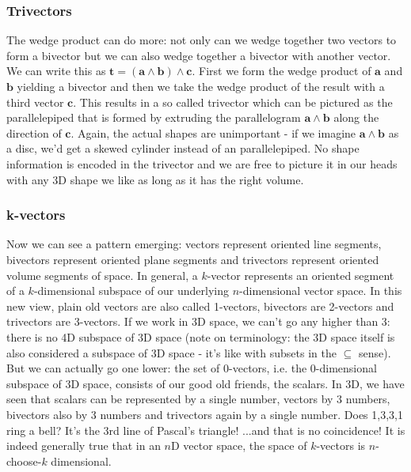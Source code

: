 \subsubsection{Trivectors}
The wedge product can do more: not only can we wedge together two vectors to form a bivector but we can also wedge together a bivector with another vector. We can write this as $\mathbf{t = (a \wedge b) \wedge c}$. First we form the wedge product of $\mathbf{a}$ and  $\mathbf{b}$ yielding a bivector and then we take the wedge product of the result with a third vector $\mathbf{c}$. This results in a so called trivector which can be pictured as the parallelepiped that is formed by extruding the parallelogram $\mathbf{a \wedge b}$ along the direction of $\mathbf{c}$. Again, the actual shapes are unimportant - if we imagine $\mathbf{a \wedge b}$ as a disc, we'd get a skewed cylinder instead of an parallelepiped. No shape information is encoded in the trivector and we are free to picture it in our heads with any 3D shape we like as long as it has the right volume.

\subsubsection{k-vectors}
Now we can see a pattern emerging: vectors represent oriented line segments, bivectors represent oriented plane segments and trivectors represent oriented volume segments of space. In general, a $k$-vector represents an oriented segment of a $k$-dimensional subspace of our underlying $n$-dimensional vector space. In this new view, plain old vectors are also called 1-vectors, bivectors are 2-vectors and trivectors are 3-vectors. If we work in 3D space, we can't go any higher than 3: there is no 4D subspace of 3D space (note on terminology: the 3D space itself is also considered a subspace of 3D space - it's like with subsets in the $\subseteq$ sense). But we can actually go one lower: the set of 0-vectors, i.e. the 0-dimensional subspace of 3D space, consists of our good old friends, the scalars. In 3D, we have seen that scalars can be represented by a single number, vectors by 3 numbers, bivectors also by 3 numbers and trivectors again by a single number. Does 1,3,3,1 ring a bell? It's the 3rd line of Pascal's triangle! ...and that is no coincidence! It is indeed generally true that in an $n$D vector space, the space of $k$-vectors is $n$-choose-$k$ dimensional.


